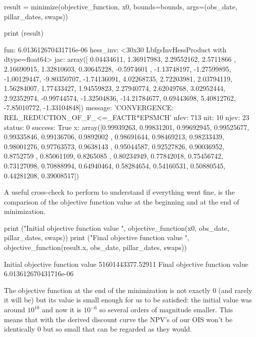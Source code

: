 \begin{ipython}
result = minimize(objective_function, x0, bounds=bounds,
                  args=(obs_date, pillar_dates, swaps))

print (result)
\end{ipython}
\begin{ioutput}
      fun: 6.013612670431716e-06
 hess_inv: <30x30 LbfgsInvHessProduct with dtype=float64>
      jac: array([  0.04434611,   1.36917983,   2.29552162,   2.5711866 ,
         2.16690915,   1.32810603,   0.30645228,  -0.5974601 ,
        -1.13748197,  -1.27599895,  -1.00129447,  -9.80350707,
        -1.74136091,   4.02268735,   2.72203981,   2.03794119,
         1.56284007,   1.77433427,   1.94559823,   2.27940774,
         2.62049768,   3.02952444,   2.92352974,  -0.99744574,
        -1.32504836, -14.21784677,   0.69443698,   5.40812762,
        -7.85010772,  -1.33104848])
  message: 'CONVERGENCE: REL_REDUCTION_OF_F_<=_FACTR*EPSMCH'
     nfev: 713
      nit: 10
     njev: 23
   status: 0
  success: True
        x: array([0.99939263, 0.99831201, 0.99692945, 0.99525677, 0.99335846,
       0.99136706, 0.9892002 , 0.98691644, 0.98469213, 0.98233439,
       0.98001276, 0.97763573, 0.9638143 , 0.95044587, 0.92527826,
       0.90036952, 0.8752759 , 0.85061109, 0.8265085 , 0.80234949,
       0.77842018, 0.75456742, 0.73127098, 0.70888994, 0.64940464,
       0.58284654, 0.54160531, 0.50880545, 0.44281208, 0.39008517])
\end{ioutput}

A useful cross-check to perform to understand if everything went fine, is the comparison of the objective function value at the beginning and at the end of minimization.

\begin{ipython}
print ("Initial objective function value ", objective_function(x0, obs_date, 
                                          pillar_dates, swaps))
print ("Final objective function value ", objective_function(result.x, obs_date,
                                          pillar_dates, swaps))
\end{ipython}
\begin{ioutput}
Initial objective function value  51601443377.52911
Final objective function value  6.013612670431716e-06
\end{ioutput}
The objective function at the end of the minimization is not exactly 0 (and rarely it will be) but its value is small enough for us to be satisfied: the initial value was around $10^{10}$ and now it is $10^{-6}$ so several orders of magnitude smaller. This means that with the derived discount curve the NPV's of our OIS won't be identically 0 but so small that can be regarded as they would.

